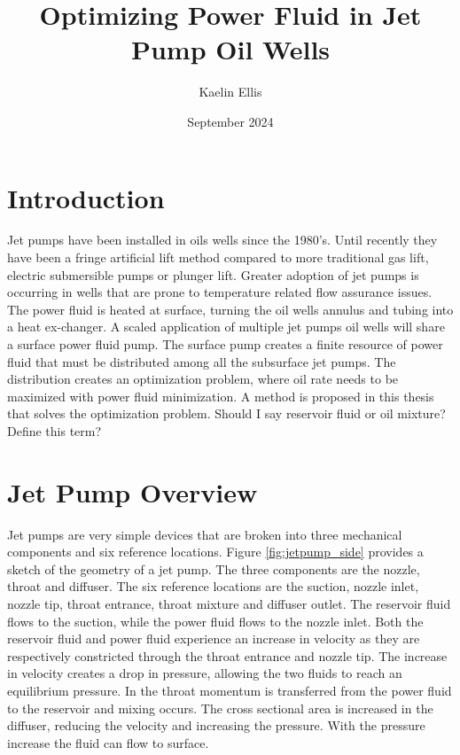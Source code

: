 \documentclass{article}
\title{Optimizing Power Fluid in Jet Pump Oil Wells}
\author{Kaelin Ellis}
\date{September 2024}
\begin{document}
\maketitle

\section{Introduction}

Jet pumps have been installed in oils wells since the 1980's. Until recently they have been a fringe artificial lift method compared to more traditional gas lift, electric submersible pumps or plunger lift. Greater adoption of jet pumps is occurring in wells that are prone to temperature related flow assurance issues. The power fluid is heated at surface, turning the oil wells annulus and tubing into a heat ex-changer. A scaled application of multiple jet pumps oil wells will share a surface power fluid pump. The surface pump creates a finite resource of power fluid that must be distributed among all the subsurface jet pumps. The distribution creates an optimization problem, where oil rate needs to be maximized with power fluid minimization. A method is proposed in this thesis that solves the optimization problem. Should I say reservoir fluid or oil mixture? Define this term?

\section{Jet Pump Overview}

Jet pumps are very simple devices that are broken into three mechanical components and six reference locations. Figure \ref{fig:jetpump_side} provides a sketch of the geometry of a jet pump. The three components are the nozzle, throat and diffuser. The six reference locations are the suction, nozzle inlet, nozzle tip, throat entrance, throat mixture and diffuser outlet. The reservoir fluid flows to the suction, while the power fluid flows to the nozzle inlet. Both the reservoir fluid and power fluid experience an increase in velocity as they are respectively constricted through the throat entrance and nozzle tip. The increase in velocity creates a drop in pressure, allowing the two fluids to reach an equilibrium pressure. In the throat momentum is transferred from the power fluid to the reservoir and mixing occurs. The cross sectional area is increased in the diffuser, reducing the velocity and increasing the pressure. With the pressure increase the fluid can flow to surface. 
\end{document}
